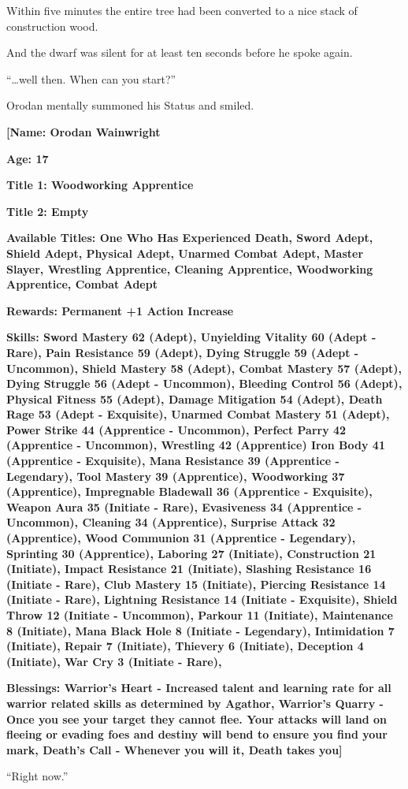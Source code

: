 \documentclass[a4paper,10pt]{book}
\begin{document}
Within five minutes the entire tree had been converted to a nice stack of construction wood.\par
And the dwarf was silent for at least ten seconds before he spoke again.\par
“…well then. When can you start?”\par
Orodan mentally summoned his Status and smiled.\par
\textbf{[Name: Orodan Wainwright}\par
\textbf{Age: 17}\par
\textbf{Title 1: Woodworking Apprentice}\par
\textbf{Title 2: Empty}\par
\textbf{Available Titles: One Who Has Experienced Death, Sword Adept, Shield Adept, Physical Adept, Unarmed Combat Adept, Master Slayer, Wrestling Apprentice, Cleaning Apprentice, Woodworking Apprentice, Combat Adept}\par
\textbf{Rewards: Permanent +1 Action Increase}\par
\textbf{Skills: Sword Mastery 62 (Adept), Unyielding Vitality 60 (Adept - Rare), Pain Resistance 59 (Adept), Dying Struggle 59 (Adept - Uncommon), Shield Mastery 58 (Adept), Combat Mastery 57 (Adept), Dying Struggle 56 (Adept - Uncommon), Bleeding Control 56 (Adept), Physical Fitness 55 (Adept), Damage Mitigation 54 (Adept), Death Rage 53 (Adept - Exquisite), Unarmed Combat Mastery 51 (Adept), Power Strike 44 (Apprentice - Uncommon), Perfect Parry 42 (Apprentice - Uncommon), Wrestling 42 (Apprentice) Iron Body 41 (Apprentice - Exquisite), Mana Resistance 39 (Apprentice - Legendary), Tool Mastery 39 (Apprentice), Woodworking 37 (Apprentice), Impregnable Bladewall 36 (Apprentice - Exquisite), Weapon Aura 35 (Initiate - Rare), Evasiveness 34 (Apprentice - Uncommon), Cleaning 34 (Apprentice), Surprise Attack 32 (Apprentice), Wood Communion 31 (Apprentice - Legendary), Sprinting 30 (Apprentice), Laboring 27 (Initiate), Construction 21 (Initiate), Impact Resistance 21 (Initiate), Slashing Resistance 16 (Initiate - Rare), Club Mastery 15 (Initiate), Piercing Resistance 14 (Initiate - Rare), Lightning Resistance 14 (Initiate - Exquisite), Shield Throw 12 (Initiate - Uncommon), Parkour 11 (Initiate), Maintenance 8 (Initiate), Mana Black Hole 8 (Initiate - Legendary), Intimidation 7 (Initiate), Repair 7 (Initiate), Thievery 6 (Initiate), Deception 4 (Initiate), War Cry 3 (Initiate - Rare),}\par
\textbf{Blessings: Warrior’s Heart - Increased talent and learning rate for all warrior related skills as determined by Agathor, Warrior’s Quarry - Once you see your target they cannot flee. Your attacks will land on fleeing or evading foes and destiny will bend to ensure you find your mark, Death’s Call - Whenever you will it, Death takes you]}\par
“Right now.”\par
\end{document}
